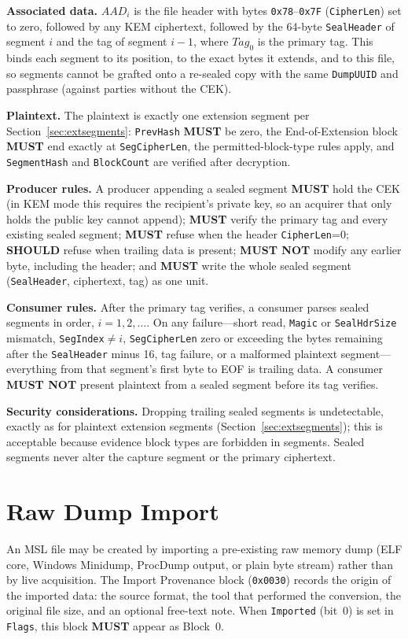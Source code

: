 \documentclass[11pt,a4paper]{article}
\newcommand{\MUST}{\textbf{MUST}}
\newcommand{\MUSTNOT}{\textbf{MUST NOT}}
\newcommand{\SHOULD}{\textbf{SHOULD}}
\newcommand{\hex}[1]{\texttt{0x#1}}
\newcommand{\field}[1]{\texttt{#1}}
\begin{document}
\noindent\textbf{Associated data.} $\mathit{AAD}_i$ is the file header with bytes \hex{78}--\hex{7F} (\field{CipherLen}) set to zero, followed by any KEM ciphertext, followed by the 64-byte \field{SealHeader} of segment $i$ and the tag of segment $i{-}1$, where $\mathit{Tag}_0$ is the primary tag. This binds each segment to its position, to the exact bytes it extends, and to this file, so segments cannot be grafted onto a re-sealed copy with the same \field{DumpUUID} and passphrase (against parties without the CEK).

\noindent\textbf{Plaintext.} The plaintext is exactly one extension segment per Section~\ref{sec:extsegments}: \field{PrevHash} \MUST{} be zero, the End-of-Extension block \MUST{} end exactly at \field{SegCipherLen}, the permitted-block-type rules apply, and \field{SegmentHash} and \field{BlockCount} are verified after decryption.

\noindent\textbf{Producer rules.} A producer appending a sealed segment \MUST{} hold the CEK (in KEM mode this requires the recipient's private key, so an acquirer that only holds the public key cannot append); \MUST{} verify the primary tag and every existing sealed segment; \MUST{} refuse when the header \field{CipherLen}=0; \SHOULD{} refuse when trailing data is present; \MUSTNOT{} modify any earlier byte, including the header; and \MUST{} write the whole sealed segment (\field{SealHeader}, ciphertext, tag) as one unit.

\noindent\textbf{Consumer rules.} After the primary tag verifies, a consumer parses sealed segments in order, $i = 1, 2, \ldots$. On any failure---short read, \field{Magic} or \field{SealHdrSize} mismatch, \field{SegIndex}$\neq i$, \field{SegCipherLen} zero or exceeding the bytes remaining after the \field{SealHeader} minus 16, tag failure, or a malformed plaintext segment---everything from that segment's first byte to EOF is trailing data. A consumer \MUSTNOT{} present plaintext from a sealed segment before its tag verifies.

\noindent\textbf{Security considerations.} Dropping trailing sealed segments is undetectable, exactly as for plaintext extension segments (Section~\ref{sec:extsegments}); this is acceptable because evidence block types are forbidden in segments. Sealed segments never alter the capture segment or the primary ciphertext.

\newpage
\section{Raw Dump Import}\label{sec:import}
An MSL file may be created by importing a pre-existing raw memory dump (ELF core, Windows Minidump, ProcDump output, or plain byte stream) rather than by live acquisition. The Import Provenance block (\hex{0030}) records the origin of the imported data: the source format, the tool that performed the conversion, the original file size, and an optional free-text note. When \field{Imported} (bit~0) is set in \field{Flags}, this block \MUST{} appear as Block~0.
\end{document}
